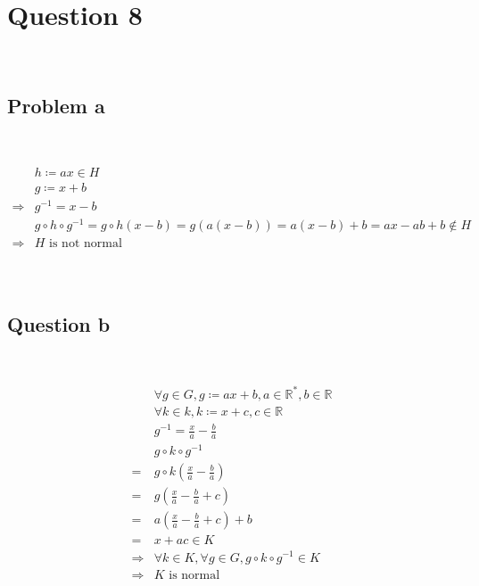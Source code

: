 \documentclass{article}
\begin{document}
\newpage

\section*{Question 8}

~

\subsection*{Problem a}

~

\begin{equation*}
    \begin{split}
        &h\coloneqq ax\in H\\
        &g\coloneqq x+b\\
        \Rightarrow&g^{-1}=x-b\\
        &g\circ h\circ g^{-1}=g\circ h(x-b)=g(a(x-b))=a(x-b)+b=ax-ab+b\notin H\\
        \Rightarrow&H\text{ is not normal}\\
    \end{split}
\end{equation*}

~

\subsection*{Question b}

~

\begin{equation*}
    \begin{split}
        &\forall g\in G, g\coloneqq ax+b,a\in\mathbb{R} ^*,b\in\mathbb{R} \\
        &\forall k\in k, k\coloneqq x+c,c\in\mathbb{R} \\
        &g^{-1}=\frac{x}{a}-\frac{b}{a}\\
        &g\circ k\circ g^{-1}\\
        =&g\circ k(\frac{x}{a}-\frac{b}{a})\\
        =&g(\frac{x}{a}-\frac{b}{a}+c)\\
        =&a(\frac{x}{a}-\frac{b}{a}+c)+b\\
        =&x+ac\in K\\
        \Rightarrow&\forall k\in K,\forall g\in G,g\circ k\circ g^{-1}\in K\\
        \Rightarrow&K\text{ is normal}\\
    \end{split}
\end{equation*}
\end{document}
